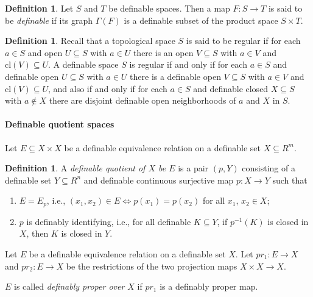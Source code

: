 \documentclass{amsart}
\theoremstyle{definition}
\newtheorem{definition}[theorem]{Definition}
\numberwithin{equation}{section}
\begin{document}
\begin{definition}
    Let $S$ and $T$ be definable spaces.
    Then a map $F: S \to T$ is said to be \emph{definable} if its graph $\Gamma(F)$ is a definable subset of the product space $S \times T$.
\end{definition}

\begin{definition}
    Recall that a topological space $S$ is said to be regular if for each $a \in  S$ and open $U \subseteq S$ with $a \in U$ there is an open $V \subseteq S$ with $a \in V$ and $\mathrm{cl}(V) \subseteq U$. 
    A definable space $S$ is regular if and only if for each $a \in S$ and definable open $U \subseteq S$ with $a \in U$ there is a definable open $V \subseteq S$ with $a \in V$ and $\mathrm{cl}(V) \subseteq U$, 
    and also if and only if for each $a \in S$ and definable closed $X \subseteq S$ with $a \notin X$ there are disjoint definable open neighborhoods of $a$ and $X$ in $S$.
\end{definition}

\paragraph{\bfseries Definable quotient spaces}

Let $E \subseteq X\times X$ be a definable equivalence relation on a definable set $X \subseteq R^m$.

\begin{definition}
    A \emph{definable quotient of $X$ be $E$} is a pair $(p,Y)$ consisting of a definable set $Y \subseteq R^n$ and definable continuous surjective map $p: X\to Y$ such that 
    \begin{enumerate}[label = {(\roman*)}]
        \item $E = E_p$, i.e., $(x_1,x_2) \in E \iff p(x_1) = p(x_2)$ for all $x_1$, $x_2 \in X$;
        \item $p$ is definably identifying, i.e., for all definable $K \subseteq Y$, if $p^{-1}(K)$ is closed in $X$, then $K$ is closed in $Y$.
    \end{enumerate}
\end{definition}

Let $E$ be a definable equivalence relation on a definable set $X$.
Let $pr_1 : E \to X$ and $pr_2 : E \to X$ be the restrictions of the two projection maps $X\times X \to X$.

$E$ is called \emph{definably proper over $X$} if $pr_1$ is a definably proper map.
\end{document}
